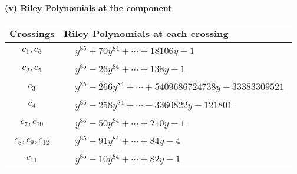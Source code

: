 \documentclass[1p]{elsarticle_modified}
\theoremstyle{definition}
\begin{document}
\flushleft \textbf{(v) Riley Polynomials at the component}\newline \\
\begin{tabular}{m{50pt}|m{274pt}}
Crossings & \hspace{64pt}Riley Polynomials at each crossing \\
\hline $$\begin{aligned}c_{1},c_{6}\end{aligned}$$&$\begin{aligned}
&y^{85}+70 y^{84}+\cdots+18106 y-1
\end{aligned}$\\
\hline $$\begin{aligned}c_{2},c_{5}\end{aligned}$$&$\begin{aligned}
&y^{85}-26 y^{84}+\cdots+138 y-1
\end{aligned}$\\
\hline $$\begin{aligned}c_{3}\end{aligned}$$&$\begin{aligned}
&y^{85}-266 y^{84}+\cdots+5409686724738 y-33383309521
\end{aligned}$\\
\hline $$\begin{aligned}c_{4}\end{aligned}$$&$\begin{aligned}
&y^{85}-258 y^{84}+\cdots-3360822 y-121801
\end{aligned}$\\
\hline $$\begin{aligned}c_{7},c_{10}\end{aligned}$$&$\begin{aligned}
&y^{85}-50 y^{84}+\cdots+210 y-1
\end{aligned}$\\
\hline $$\begin{aligned}c_{8},c_{9},c_{12}\end{aligned}$$&$\begin{aligned}
&y^{85}-91 y^{84}+\cdots+84 y-4
\end{aligned}$\\
\hline $$\begin{aligned}c_{11}\end{aligned}$$&$\begin{aligned}
&y^{85}-10 y^{84}+\cdots+82 y-1
\end{aligned}$\\
\hline
\end{tabular}\\~\\
\end{document}
